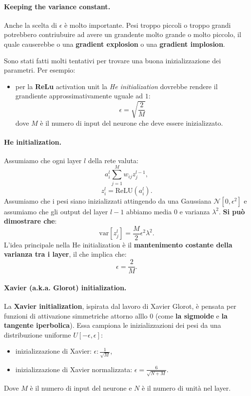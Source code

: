 \paragraph{Keeping the variance constant.} Anche la scelta di $\epsilon$ è molto importante. Pesi troppo piccoli o troppo grandi potrebbero contriubuire ad avere un grandente molto grande o molto piccolo, il quale causerebbe o una \textbf{gradient explosion} o una \textbf{gradient implosion}. 


Sono stati fatti molti tentativi per trovare una buona inizializzazione dei parametri. Per esempio:
\begin{itemize}
    \item per la \textbf{ReLu} activation unit la \textit{He initialization} dovrebbe rendere il grandiente approssimativamente uguale ad $1$:
    \begin{equation}
        \epsilon=\sqrt{\frac{2}{M}}
    \end{equation}
    dove $M$ è il numero di input del neurone che deve essere inizializzato.
\end{itemize}

\paragraph{He initialization.} Assumiamo che ogni layer $l$ della rete valuta:
\begin{equation}
    a^l_i \sum^M_{j=1}w_{ij}z_j^{l-1},
\end{equation}
\begin{equation}
    z^l_i=\text{ReLU}(a_i^l).
\end{equation}
Assumiamo che i pesi siano inizializzati attingendo da una Gaussiana $\mathcal{N}[0,\epsilon^2]$ e assumiamo che gli output del layer $l-1$ abbiamo media $0$ e varianza $\lambda^2$. \textbf{Si può dimostrare che}:
\begin{equation}
    \text{var}[z^l_j]=\frac{M}{2}\epsilon^2\lambda^2.
\end{equation}
L'idea principale nella He initialization è il \textbf{mantenimento costante della varianza tra i layer}, il che implica che:
\begin{equation}
    \epsilon=\frac{2}{M}.
\end{equation}

\paragraph{Xavier (a.k.a. Glorot) initialization.} La \textbf{Xavier initialization}, ispirata dal lavoro di Xavier Glorot, è pensata per funzioni di attivazione simmetriche attorno alllo $0$ (come \textbf{la sigmoide} e \textbf{la tangente iperbolica}). Essa campiona le inizializzazioni dei pesi da una distribuzione uniforme $U[-\epsilon,\epsilon]$:
\begin{itemize}
    \item inizializzazione di Xavier: $\epsilon:\frac{1}{\sqrt{M}}$,
    \item inizializzazione di Xavier normalizzata: $\epsilon = \frac{6}{\sqrt{N+M}}$.
\end{itemize}
Dove $M$ è il numero di input del neurone e $N$ è il numero di unità nel layer.
\newpage
